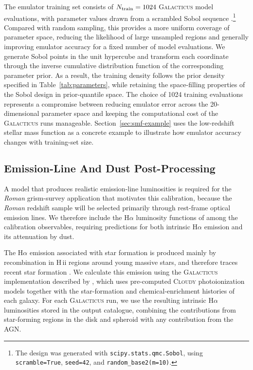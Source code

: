 \documentclass[twocolumn, apj, numberedappendix, iop]{openjournal}
\newcommand{\galacticus}{\textsc{Galacticus}\xspace}
\newcommand{\romanspace}{\textit{Roman}\xspace}
\newcommand{\ha}{H$\alpha$}
\begin{document}
The emulator training set consists of $N_{\rm train}=1024$ \galacticus{} model evaluations, with parameter values drawn from a scrambled Sobol sequence \citep{1967USSR...7...86S, 1997AnSta..25.1541O}.\footnote{The design was generated with \texttt{scipy.stats.qmc.Sobol}, using \texttt{scramble=True}, \texttt{seed=42}, and \texttt{random\_base2(m=10)}.}
Compared with random sampling, this provides a more uniform coverage of parameter space, reducing the likelihood of large unsampled regions and generally improving emulator accuracy for a fixed number of model evaluations.
We generate Sobol points in the unit hypercube and transform each coordinate through the inverse cumulative distribution function of the corresponding parameter prior.
As a result, the training density follows the prior density specified in Table~\ref{tab:parameters}, while retaining the space-filling properties of the Sobol design in prior-quantile space.
The choice of 1024 training evaluations represents a compromise between reducing emulator error across the 20-dimensional parameter space and keeping the computational cost of the \galacticus{} runs manageable.
Section~\ref{sec:smf-example} uses the low-redshift stellar mass function as a concrete example to illustrate how emulator accuracy changes with training-set size.

\subsection{Emission-Line And Dust Post-Processing}
\label{sec:dust-postprocessing}

A model that produces realistic emission-line luminosities is required for the \romanspace{} grism-survey application that motivates this calibration, because the \romanspace{} redshift sample will be selected primarily through rest-frame optical emission lines. We therefore include the \ha{} luminosity functions of \citet{2013MNRAS.428.1128S} among the calibration observables, requiring predictions for both intrinsic \ha{} emission and its attenuation by dust.

The \ha{} emission associated with star formation is produced mainly by
recombination in H\,{\sc ii} regions around young massive stars, and therefore
traces recent star formation \citep[e.g.][]{1998ARA&A..36..189K}. We calculate
this emission using the \galacticus{} implementation described by
\citet{2018MNRAS.474..177M}, which uses pre-computed \textsc{Cloudy}
\citep{2013RMxAA..49..137F} photoionization models together with the
star-formation and chemical-enrichment histories of each galaxy. For each
\galacticus{} run, we use the resulting intrinsic \ha{} luminosities stored in
the output catalogue, combining the contributions from star-forming regions in
the disk and spheroid with any contribution from the AGN.
\end{document}
